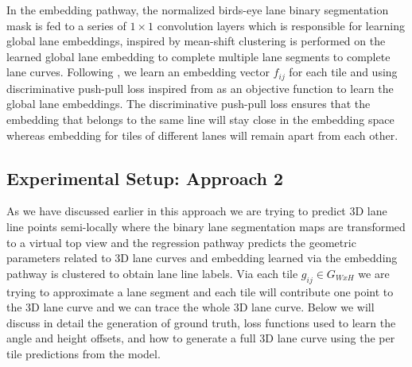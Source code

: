      In the embedding pathway, the normalized birds-eye lane binary segmentation mask is fed to a series of $1 \times 1$ convolution layers which is responsible for learning global lane embeddings, inspired by \cite{DBLP:journals/corr/abs-1802-05591} mean-shift clustering is performed on the learned global lane embedding to complete multiple lane segments to complete lane curves. Following \cite{DBLP:journals/corr/abs-2011-01535}, we learn an embedding vector $f_{ij}$ for each tile and using discriminative push-pull loss inspired from \cite{DBLP:journals/corr/abs-2011-01535} \cite{DBLP:journals/corr/abs-1802-05591} as an objective function to learn the global lane embeddings. The discriminative push-pull loss ensures that the embedding that belongs to the same line will stay close in the embedding space whereas embedding for tiles of different lanes will remain apart from each other. 

    \subsection{Experimental Setup: Approach 2}
    As we have discussed earlier in this approach we are trying to predict 3D lane line points semi-locally where the binary lane segmentation maps are transformed to a virtual top view and the regression pathway predicts the geometric parameters related to 3D lane curves and embedding learned via the embedding pathway is clustered to obtain lane line labels. Via each tile $g_{ij} \in G_{WxH}$ we are trying to approximate a lane segment and each tile will contribute one point to the 3D lane curve and we can trace the whole 3D lane curve. Below we will discuss in detail the generation of ground truth, loss functions used to learn the angle and height offsets, and how to generate a full 3D lane curve using the per tile predictions from the model. 
